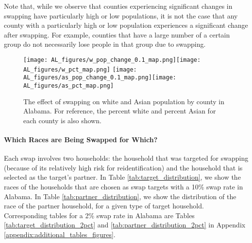Note that, while we observe that counties experiencing significant changes in swapping have particularly high or low populations, it is not the case that any county with a particularly high or low population experiences a significant change after swapping. For example, counties that have a large number of a certain group do not necessarily lose people in that group due to swapping. 

\begin{figure}
    \centering
    \texttt{[image: AL\_figures/w\_pop\_change\_0.1\_map.png]}\texttt{[image: AL\_figures/w\_pct\_map.png]}\hspace{5mm}  \texttt{[image: AL\_figures/as\_pop\_change\_0.1\_map.png]}\texttt{[image: AL\_figures/as\_pct\_map.png]}
    \caption{The effect of swapping on white and Asian population by county in Alabama. For reference, the percent white and percent Asian for each county is also shown.}
    \label{fig:map_w_al}
\end{figure}


\paragraph{Which Races are Being Swapped for Which?}
Each swap involves two households: the household that was targeted for swapping (because of its relatively high risk for reidentification) and the household that is selected as the target's partner. In Table \ref{tab:target_distribution}, we show the races of the households that are chosen as swap targets with a 10\% swap rate in Alabama. In Table \ref{tab:partner_distribution}, we show the distribution of the race of the partner household, for a given type of target household. Corresponding tables for a 2\% swap rate in Alabama are Tables \ref{tab:target_distribution_2pct} and \ref{tab:partner_distribution_2pct} in Appendix \ref{appendix:additional_tables_figures}.

